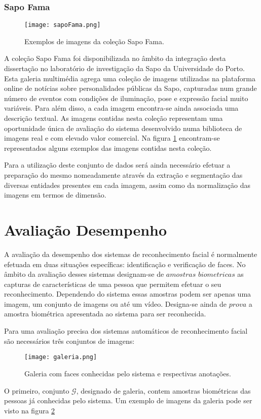 \subsubsection{Sapo Fama}
\begin{figure}[ht]
  \begin{center}
    \leavevmode
    \texttt{[image: sapoFama.png]}
    \caption{Exemplos de imagens da coleção Sapo Fama.}	
    \label{fig:sapoFama}
  \end{center}
\end{figure}
A coleção Sapo Fama foi disponibilizada no âmbito da integração desta dissertação no laboratório de investigação da Sapo da Universidade do Porto. Esta galeria multimédia agrega uma coleção de imagens utilizadas na plataforma online de notícias sobre personalidades públicas da Sapo, capturadas num grande número de eventos com condições de iluminação, pose e expressão facial muito variáveis. Para além disso, a cada imagem encontra-se ainda associada uma descrição textual. As imagens contidas nesta coleção representam uma oportunidade única de avaliação do sistema desenvolvido numa biblioteca de imagens real e com elevado valor comercial. Na figura \ref{fig:sapoFama} encontram-se representados alguns exemplos das imagens contidas nesta coleção.

Para a utilização deste conjunto de dados será ainda necessário efetuar a preparação do mesmo nomeadamente através da extração e segmentação das diversas entidades presentes em cada imagem, assim como da normalização das imagens em termos de dimensão.

\section{Avaliação Desempenho}
A avaliação da desempenho dos sistemas de reconhecimento facial é normalmente efetuada em duas situações específicas: identificação e verificação de faces. No âmbito da avaliação desses sistemas designam-se de $amostras$ $biometricas$ as capturas de características de uma pessoa que permitem efetuar o seu reconhecimento. Dependendo do sistema essas amostras podem ser apenas uma imagem, um conjunto de imagens ou até um vídeo. Designa-se ainda de $prova$ a amostra biométrica apresentada ao sistema para ser reconhecida.

Para uma avaliação precisa dos sistemas automáticos de reconhecimento facial são necessários três conjuntos de imagens:
\begin{figure}[ht]
  \begin{center}
    \leavevmode
    \texttt{[image: galeria.png]}
    \caption{Galeria com faces conhecidas pelo sistema e respectivas anotações.}	
    \label{fig:galeria}
  \end{center}
\end{figure}
O primeiro, conjunto $\mathscr{G}$, designado de galeria, contem amostras biométricas das pessoas já conhecidas pelo sistema. Um exemplo de imagens da galeria pode ser visto na figura \ref{fig:galeria}

